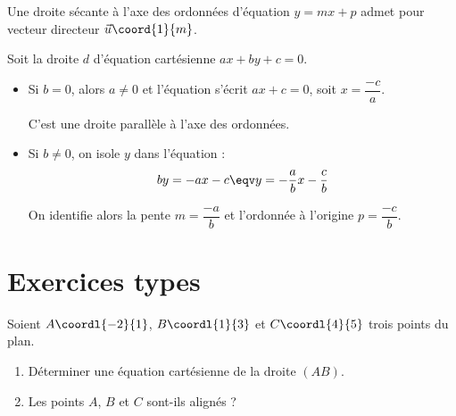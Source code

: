 \begin{remarque}
	Une droite sécante à l'axe des ordonnées d'équation $y = mx + p$ admet pour vecteur directeur $\vec{u}\coord{1}{m}$.
\end{remarque}

\begin{methode}
	Soit la droite $d$ d'équation cartésienne $ax + by + c = 0$.
	\begin{itemize}
		\item Si $b = 0$, alors $a \neq 0$ et l'équation s'écrit $ax + c = 0$, soit $x = \dfrac{-c}{a}$.

		      C'est une droite parallèle à l'axe des ordonnées.
		\item Si $b \neq 0$, on isole $y$ dans l'équation :
		      \[
			      by = -ax - c \eqv y = -\frac{a}{b}x - \frac{c}{b}
		      \]

		      On identifie alors la pente $m = \dfrac{-a}{b}$ et l'ordonnée à l'origine $p = \dfrac{-c}{b}$.
	\end{itemize}
\end{methode}

\section{Exercices types}

\begin{exercice}
	Soient $A\coordl{-2}{1}$, $B\coordl{1}{3}$ et $C\coordl{4}{5}$ trois points du plan.
	\begin{enumerate}
		\item Déterminer une équation cartésienne de la droite $(AB)$.
		\item Les points $A$, $B$ et $C$ sont-ils alignés ?
	\end{enumerate}
\end{exercice}

